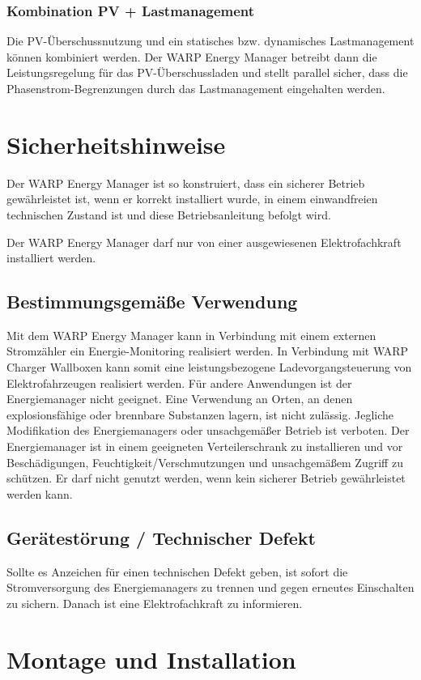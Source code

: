 \documentclass[a4paper,10pt]{article}
\newcommand{\hint}[1]{\begin{tcolorbox}[colback=boxgray,colframe=black,coltext=
white,title=Hinweis,left*=2mm,right*=2mm,boxsep=1mm,bottom=1mm,top=1mm]#1\end{tcolorbox}}
\begin{document}
\begin{multicols*}{2}
	\subsubsection{Kombination PV + Lastmanagement}
	Die PV-Überschussnutzung und ein statisches bzw. dynamisches Lastmanagement können
	kombiniert werden. Der WARP Energy Manager betreibt dann die
	Leistungsregelung für das PV-Überschussladen und stellt parallel sicher, dass die
	Phasenstrom-Begrenzungen durch das Lastmanagement eingehalten werden.

	\newpage
	\section{Sicherheitshinweise}
	Der WARP Energy Manager ist so konstruiert, dass ein sicherer Betrieb gewährleistet ist,
	wenn er korrekt installiert wurde, in einem einwandfreien technischen Zustand
	ist und diese Betriebsanleitung befolgt wird. \hint{Der WARP Energy Manager darf nur von einer ausgewiesenen Elektrofachkraft installiert
		werden.}

	\subsection{Bestimmungsgemäße Verwendung}
	Mit dem WARP Energy Manager kann in Verbindung mit einem externen
	Stromzähler ein Energie-Monitoring realisiert werden. In Verbindung mit WARP
	Charger Wallboxen kann somit eine leistungsbezogene Ladevorgangsteuerung von
	Elektrofahrzeugen realisiert werden. Für andere Anwendungen ist der
	Energiemanager nicht geeignet. Eine Verwendung
	an Orten, an denen explosionsfähige oder brennbare Substanzen lagern, ist nicht
	zulässig. Jegliche Modifikation des Energiemanagers oder unsachgemäßer Betrieb ist verboten.
	Der Energiemanager ist in einem geeigneten Verteilerschrank zu installieren
	und vor Beschädigungen, Feuchtigkeit/Verschmutzungen und unsachgemäßem
	Zugriff zu schützen. Er darf nicht genutzt werden, wenn kein sicherer Betrieb
	gewährleistet werden kann.

	\subsection{Gerätestörung / Technischer Defekt}
	Sollte es Anzeichen für einen technischen Defekt geben, ist sofort die
	Stromversorgung des Energiemanagers zu trennen und gegen erneutes Einschalten zu
	sichern. Danach ist eine Elektrofachkraft zu informieren.

	\newpage
	\section{Montage und Installation}

\end{multicols*}
\end{document}
